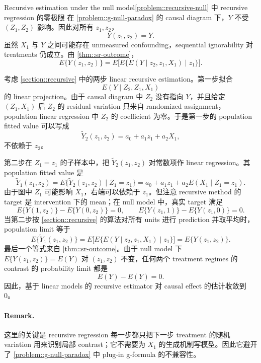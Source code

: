 \begin{exercisesolution}{Recursive estimation under the null model}{\cref{problem::recursive-null} 中 recursive regression 的零极限}
在 \cref{problem::g-null-paradox} 的 causal diagram 下，$Y$ 不受 $(Z_1,Z_2)$ 影响。因此对所有 $z_1,z_2$，
\[
Y(z_1,z_2)=Y.
\]
虽然 $X_1$ 与 $Y$ 之间可能存在 unmeasured confounding，sequential ignorability 对 treatments 仍成立。由 \cref{thm::sr-outcome}，
\[
E\{Y(z_1,z_2)\}
=
E\Big[E\{E(Y\mid z_2,z_1,X_1)\mid z_1\}\Big].
\]

考虑 \cref{section::recursive} 中的两步 linear recursive estimation。第一步拟合
\[
E(Y\mid Z_2,Z_1,X_1)
\]
的 linear projection。由于 causal diagram 中 $Z_2$ 没有指向 $Y$，并且给定 $(Z_1,X_1)$ 后 $Z_2$ 的 residual variation 只来自 randomized assignment，population linear regression 中 $Z_2$ 的 coefficient 为零。于是第一步的 population fitted value 可以写成
\[
\tilde Y_2(z_1,z_2)=a_0+a_1 z_1+a_2 X_1,
\]
不依赖于 $z_2$。

第二步在 $Z_1=z_1$ 的子样本中，把 $\tilde Y_2(z_1,z_2)$ 对常数项作 linear regression。其 population fitted value 是
\[
\tilde Y_1(z_1,z_2)
=
E\{\tilde Y_2(z_1,z_2)\mid Z_1=z_1\}
=a_0+a_1 z_1+a_2 E(X_1\mid Z_1=z_1).
\]
由于图中 $Z_1$ 可能影响 $X_1$，右端可以依赖于 $z_1$。但注意 recursive method 的 target 是 intervention 下的 mean；在 null model 中，真实 target 满足
\[
E\{Y(1,z_2)\}-E\{Y(0,z_2)\}=0,
\qquad
E\{Y(z_1,1)\}-E\{Y(z_1,0)\}=0.
\]
当第二步按 \cref{section::recursive} 的算法对所有 units 进行 prediction 并取平均时，population limit 等于
\[
E\{\tilde Y_1(z_1,z_2)\}
=E\Big[E\{E(Y\mid z_2,z_1,X_1)\mid z_1\}\Big]
=E\{Y(z_1,z_2)\}.
\]
最后一个等式来自 \cref{thm::sr-outcome}。由于 null model 下 $E\{Y(z_1,z_2)\}=E(Y)$ 对 $(z_1,z_2)$ 不变，任何两个 treatment regimes 的 contrast 的 probability limit 都是
\[
E(Y)-E(Y)=0.
\]
因此，基于 linear models 的 recursive estimator 对 causal effect 的估计收敛到 0。

\paragraph{Remark.}
这里的关键是 recursive regression 每一步都只把下一步 treatment 的随机 variation 用来识别局部 contrast；它不需要为 $X_1$ 的生成机制写模型。因此它避开了 \cref{problem::g-null-paradox} 中 plug-in g-formula 的不兼容性。
\end{exercisesolution}

